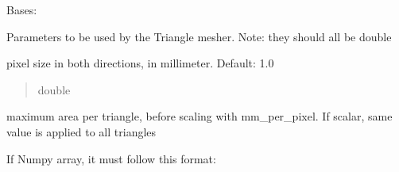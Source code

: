 \documentclass[letterpaper,10pt,english]{sphinxmanual}
\begin{document}
\begin{fulllineitems}
\label{\detokenize{_autosummary/nirfasterff.utils.MeshingParams2D:nirfasterff.utils.MeshingParams2D}}
\pysigstartsignatures
\pysiglinewithargsret
{}
{\sphinxparamcomma {}\sphinxparamcomma {}}
{}
\pysigstopsignatures
\sphinxAtStartPar
Bases: 

\sphinxAtStartPar
Parameters to be used by the Triangle mesher. Note: they should all be double

\begin{fulllineitems}
\label{\detokenize{_autosummary/nirfasterff.utils.MeshingParams2D:nirfasterff.utils.MeshingParams2D.mm_per_pixel}}
\pysigstartsignatures
\pysigline
{}
\pysigstopsignatures
\sphinxAtStartPar
pixel size in both directions, in millimeter. Default: 1.0
\begin{quote}\begin{description}
\sphinxAtStartPar
double

\end{description}\end{quote}

\end{fulllineitems}


\begin{fulllineitems}
\label{\detokenize{_autosummary/nirfasterff.utils.MeshingParams2D:nirfasterff.utils.MeshingParams2D.max_area}}
\pysigstartsignatures
\pysigline
{}
\pysigstopsignatures
\sphinxAtStartPar
maximum area per triangle, before scaling with mm\_per\_pixel. If scalar, same value is applied to all triangles

\sphinxAtStartPar
If Numpy array, it must follow this format:


\end{fulllineitems}
\end{fulllineitems}
\end{document}
